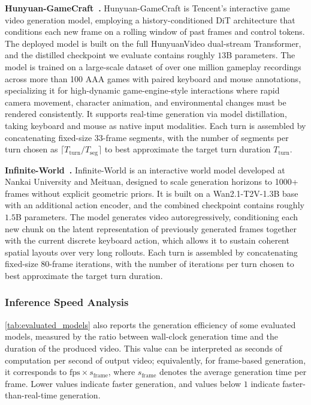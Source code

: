 \documentclass{llmxive}
\providecommand{\myparagraph}[1]{\vspace{-0.1em}\noindent\textbf{#1}\hspace{0.3em}}
\begin{document}
\myparagraph{Hunyuan-GameCraft~\cite{li2025hunyuangamecraft}.}
Hunyuan-GameCraft is Tencent's interactive game video generation model, employing a history-conditioned DiT architecture that conditions each new frame on a rolling window of past frames and control tokens.
The deployed model is built on the full HunyuanVideo dual-stream Transformer, and the distilled checkpoint we evaluate contains roughly $13$B parameters.
The model is trained on a large-scale dataset of over one million gameplay recordings across more than 100 AAA games with paired keyboard and mouse annotations, specializing it for high-dynamic game-engine-style interactions where rapid camera movement, character animation, and environmental changes must be rendered consistently.
It supports real-time generation via model distillation, taking keyboard and mouse as native input modalities.
Each turn is assembled by concatenating fixed-size $33$-frame segments, with the number of segments per turn chosen as $\lceil T_{\text{turn}} / T_{\text{seg}} \rceil$ to best approximate the target turn duration $T_{\text{turn}}$.

\myparagraph{Infinite-World~\cite{wu2026infiniteworld}.}
Infinite-World is an interactive world model developed at Nankai University and Meituan, designed to scale generation horizons to 1000+ frames without explicit geometric priors.
It is built on a Wan2.1-T2V-1.3B base with an additional action encoder, and the combined checkpoint contains roughly $1.5$B parameters.
The model generates video autoregressively, conditioning each new chunk on the latent representation of previously generated frames together with the current discrete keyboard action, which allows it to sustain coherent spatial layouts over very long rollouts.
Each turn is assembled by concatenating fixed-size $80$-frame iterations, with the number of iterations per turn chosen to best approximate the target turn duration.


\subsubsection{Inference Speed Analysis}

\cref{tab:evaluated_models} also reports the generation efficiency of some evaluated models, measured by the ratio between wall-clock generation time and the duration of the produced video. This value can be interpreted as seconds of computation per second of output video; equivalently, for frame-based generation, it corresponds to $\mathrm{fps}\times s_{\text{frame}}$, where $s_{\text{frame}}$ denotes the average generation time per frame. Lower values indicate faster generation, and values below $1$ indicate faster-than-real-time generation.
\end{document}
